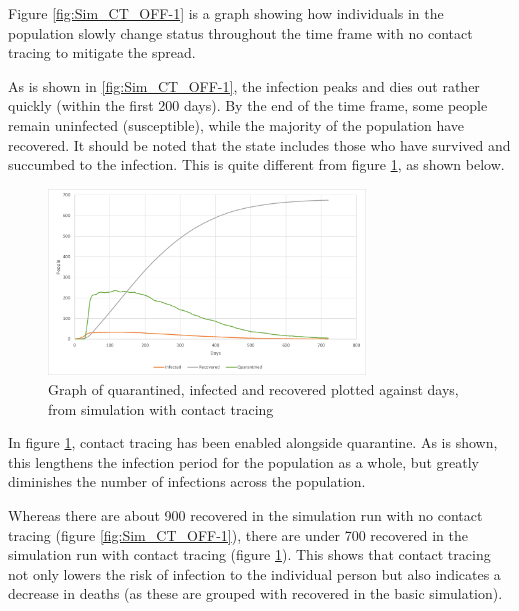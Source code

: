 Figure \ref{fig:Sim_CT_OFF-1} is a graph showing how individuals in the population slowly change status throughout the time frame with no contact tracing to mitigate the spread.

As is shown in \ref{fig:Sim_CT_OFF-1}, the infection peaks and dies out rather quickly (within the first 200 days). By the end of the time frame, some people remain uninfected (susceptible), while the majority of the population have recovered. It should be noted that the  state includes those who have survived and succumbed to the infection. This is quite different from figure \ref{fig:Sim_CT_ON-1}, as shown below.

\begin{figure}[H]
    \centering
    \includegraphics[width=0.75\textwidth]{0_billeder/Sim_CT_ON.png}
    \caption{Graph of quarantined, infected and recovered plotted against days, from simulation with contact tracing}
    \label{fig:Sim_CT_ON-1}
\end{figure}

In figure \ref{fig:Sim_CT_ON-1}, contact tracing has been enabled alongside quarantine. As is shown, this lengthens the infection period for the population as a whole, but greatly diminishes the number of infections across the population. 

Whereas there are about 900 recovered in the simulation run with no contact tracing (figure \ref{fig:Sim_CT_OFF-1}), there are under 700 recovered in the simulation run with contact tracing (figure \ref{fig:Sim_CT_ON-1}). This shows that contact tracing not only lowers the risk of infection to the individual person but also indicates a decrease in deaths (as these are grouped with recovered in the basic simulation).